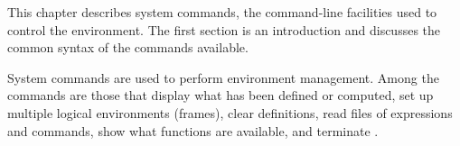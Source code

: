 
%
%
%
%
%


This chapter describes system commands, the command-line
facilities used to control the \Language{} environment.
The first section is an introduction and discusses the common
syntax of the commands available.


System commands are used to perform \Language{} environment
management.
Among the commands are those that display what has been defined or
computed, set up multiple logical \Language{} environments
(frames), clear definitions, read files of expressions and
commands, show what functions are available, and terminate
\Language{}.

